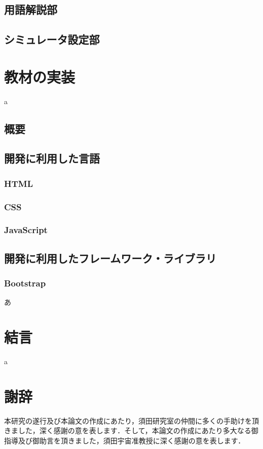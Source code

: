 \documentclass[12pt,a4j,titlepage]{ltjsarticle}
\begin{document}
\subsection{用語解説部}
\subsection{シミュレータ設定部}

\clearpage
\section{教材の実装}
a
\subsection{概要}
\subsection{開発に利用した言語}
\subsubsection{HTML}
\subsubsection{CSS}
\subsubsection{JavaScript}

\subsection{開発に利用したフレームワーク・ライブラリ}
\subsubsection{Bootstrap}
あ

\clearpage
\section{結言}
a
\clearpage
\section{謝辞}
本研究の遂行及び本論文の作成にあたり，須田研究室の仲間に多くの手助けを頂きました，深く感謝の意を表します．そして，本論文の作成にあたり多大なる御指導及び御助言を頂きました，須田宇宙准教授に深く感謝の意を表します．
\clearpage
\end{document}
